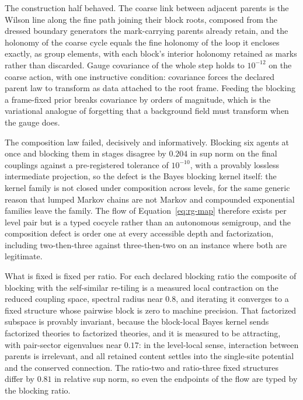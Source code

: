 \documentclass[11pt,letterpaper]{article}
\begin{document}
The construction half behaved. The coarse link between adjacent parents is the Wilson line along the fine path joining their block roots, composed from the dressed boundary generators the mark-carrying parents already retain, and the holonomy of the coarse cycle equals the fine holonomy of the loop it encloses exactly, as group elements, with each block's interior holonomy retained as marks rather than discarded. Gauge covariance of the whole step holds to $10^{-12}$ on the coarse action, with one instructive condition: covariance forces the declared parent law to transform as data attached to the root frame. Feeding the blocking a frame-fixed prior breaks covariance by orders of magnitude, which is the variational analogue of forgetting that a background field must transform when the gauge does.

The composition law failed, decisively and informatively. Blocking six agents at once and blocking them in stages disagree by $0.204$ in sup norm on the final couplings against a pre-registered tolerance of $10^{-10}$, with a provably lossless intermediate projection, so the defect is the Bayes blocking kernel itself: the kernel family is not closed under composition across levels, for the same generic reason that lumped Markov chains are not Markov and compounded exponential families leave the family. The flow of Equation~\eqref{eq:rg-map} therefore exists per level pair but is a typed cocycle rather than an autonomous semigroup, and the composition defect is order one at every accessible depth and factorization, including two-then-three against three-then-two on an instance where both are legitimate.

What is fixed is fixed per ratio. For each declared blocking ratio the composite of blocking with the self-similar re-tiling is a measured local contraction on the reduced coupling space, spectral radius near $0.8$, and iterating it converges to a fixed structure whose pairwise block is zero to machine precision. That factorized subspace is provably invariant, because the block-local Bayes kernel sends factorized theories to factorized theories, and it is measured to be attracting, with pair-sector eigenvalues near $0.17$: in the level-local sense, interaction between parents is irrelevant, and all retained content settles into the single-site potential and the conserved connection. The ratio-two and ratio-three fixed structures differ by $0.81$ in relative sup norm, so even the endpoints of the flow are typed by the blocking ratio.
\end{document}
